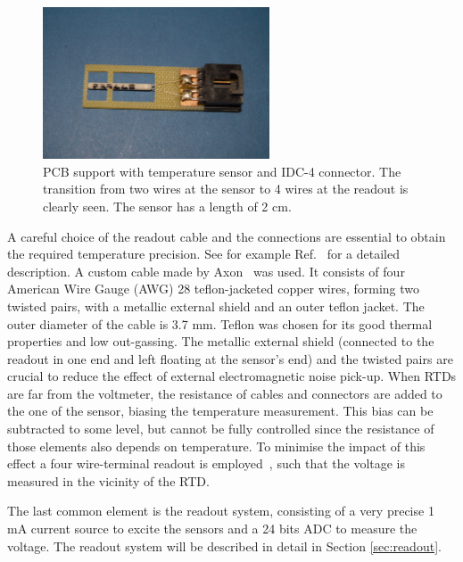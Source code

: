 \begin{figure}[htbp]
\begin{center}
\includegraphics[angle=-90, width=0.6\textwidth]{./figure_1.jpg}%
\caption{PCB support with temperature sensor and IDC-4 connector. The transition from two wires at the sensor to 4 wires at the readout is clearly seen. The sensor has a length of 2 cm.
\label{fig:sensor}}
\end{center}
\end{figure}

A careful choice of the readout cable and the connections are essential to obtain the required temperature precision. See for example Ref.~\cite{minco} for a detailed description. A custom cable made by Axon~\cite{axon} was used. It consists of four American Wire Gauge (AWG) 28 teflon-jacketed copper wires, forming two twisted pairs, with a metallic external shield and an outer teflon jacket. The outer diameter of the cable is 3.7 mm. Teflon was chosen for its good thermal properties and low out-gassing. The metallic external shield (connected to the readout in one end and left floating at the sensor's end) and the twisted pairs are crucial to reduce the effect of external electromagnetic noise pick-up. When RTDs are far from the voltmeter, the resistance of cables and connectors are added to the one of the sensor, biasing the temperature measurement. This bias can be subtracted to some level, but cannot be fully controlled since the resistance of those elements also depends on temperature. To minimise the impact of this effect a four wire-terminal readout is employed~\cite{minco}, such that the voltage is measured in the vicinity of the RTD.

The last common element is the readout system, consisting of a very precise 1 mA current source to excite the sensors and a 24 bits ADC to measure the voltage. The readout system will be described in detail in Section \ref{sec:readout}.

